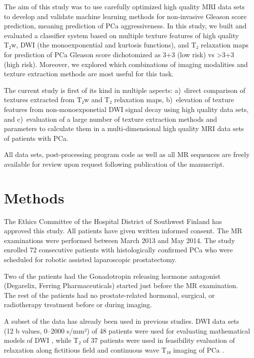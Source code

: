 \documentclass[10pt,letterpaper]{article}
\newcommand{\citep}{\cite}
\begin{document}
The aim of this study was to use carefully optimized high quality MRI data sets
to develop and validate machine learning methods for non-invasive Gleason score
prediction, meaning prediction of PCa aggressiveness. In this study, we built
and evaluated a classifier system based on multiple texture features of high
quality T₂w, DWI (the monoexponential and kurtosis functions), and T₂ relaxation
maps for prediction of PCa Gleason score dichotomized as 3+3 (low risk) vs >3+3
(high risk). Moreover, we explored which combinations of imaging modalities and
texture extraction methods are most useful for this task.

The current study is first of its kind in multiple aspects: a)~direct comparison
of textures extracted from T₂w and T₂ relaxation maps, b)~elevation of texture
features from non-monoexponetial DWI signal decay using high quality data sets,
and c)~evaluation of a large number of texture extraction methods and parameters
to calculate them in a multi-dimensional high quality MRI data sets of patients
with PCa.

All data sets, post-processing program code as well as all MR sequences are
freely available for review upon request following publication of the
manuscript.

%
\newpage
\section{Methods}

The Ethics Committee of the Hospital District of Southwest Finland has approved
this study. All patients have given written informed consent. The MR
examinations were performed between March 2013 and May 2014. The study enrolled
72 consecutive patients with histologically confirmed PCa who were scheduled for
robotic assisted laparoscopic prostatectomy.

Two of the patients had the Gonadotropin releasing hormone antagonist
(Degarelix, Ferring Pharmaceuticals) started just before the MR examination. The
rest of the patients had no prostate-related hormonal, surgical, or radiotherapy
treatment before or during imaging.

A subset of the data has already been used in previous studies. DWI data sets
(12 b values, 0--2000 s/mm²) of 48 patients were used for evaluating
mathematical models of DWI \citep{Toivonen2015, Jambor2015Relaxation,
Jambor2015Evaluation}, while T₂ of 37 patients were used in feasibility
evaluation of relaxation along fictitious field and continuous wave T₁ᵨ imaging
of PCa \citep{Jambor2015Relaxation, Jambor2015Rotating}.
\end{document}

